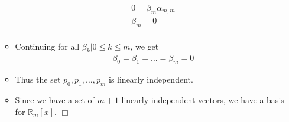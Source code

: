 \documentclass[11pt]{article}
\newcommand{\R}{\mathbb{R}}
\begin{document}
\begin{enumerate}
\begin{itemize}
\begin{align*}
    & 0 = \beta_m \alpha_{m,m}\\
    & \beta_m = 0\\
  \end{align*}
\item[] Continuing for all $\beta_k | 0 \leq k \leq m$, we get \begin{align*}
    & \beta_0 = \beta_1 = \dots = \beta_m = 0
  \end{align*}
\item[] Thus the set $p_0, p_1, \dots, p_m$ is linearly independent. 
\item[] Since we have a set of $m+1$ linearly independent vectors, we have a basis for $\R_m[x]$. $\Box$


    \end{itemize}
\end{enumerate}
\end{document}
